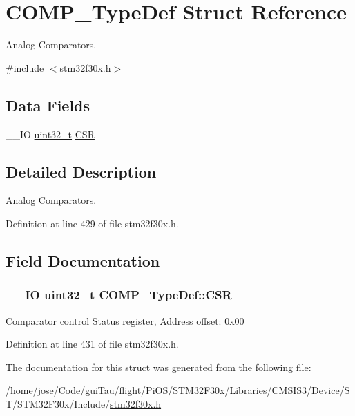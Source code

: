 \hypertarget{struct_c_o_m_p___type_def}{\section{C\-O\-M\-P\-\_\-\-Type\-Def Struct Reference}
\label{struct_c_o_m_p___type_def}
}


Analog Comparators.  




{\ttfamily \#include $<$stm32f30x.\-h$>$}

\subsection*{Data Fields}
\begin{DoxyCompactItemize}
\item 
\-\_\-\-\_\-\-I\-O \hyperlink{stdint_8h_a435d1572bf3f880d55459d9805097f62}{uint32\-\_\-t} \hyperlink{struct_c_o_m_p___type_def_ab894a4f70da24aa3c39b2c9a3790cbf8}{C\-S\-R}
\end{DoxyCompactItemize}


\subsection{Detailed Description}
Analog Comparators. 

Definition at line 429 of file stm32f30x.\-h.



\subsection{Field Documentation}
\hypertarget{struct_c_o_m_p___type_def_ab894a4f70da24aa3c39b2c9a3790cbf8}{
\subsubsection[{C\-S\-R}]{\setlength{\rightskip}{0pt plus 5cm}\-\_\-\-\_\-\-I\-O {\bf uint32\-\_\-t} C\-O\-M\-P\-\_\-\-Type\-Def\-::\-C\-S\-R}}\label{struct_c_o_m_p___type_def_ab894a4f70da24aa3c39b2c9a3790cbf8}
Comparator control Status register, Address offset\-: 0x00 

Definition at line 431 of file stm32f30x.\-h.



The documentation for this struct was generated from the following file\-:\begin{DoxyCompactItemize}
\item 
/home/jose/\-Code/gui\-Tau/flight/\-Pi\-O\-S/\-S\-T\-M32\-F30x/\-Libraries/\-C\-M\-S\-I\-S3/\-Device/\-S\-T/\-S\-T\-M32\-F30x/\-Include/\hyperlink{stm32f30x_8h}{stm32f30x.\-h}\end{DoxyCompactItemize}
